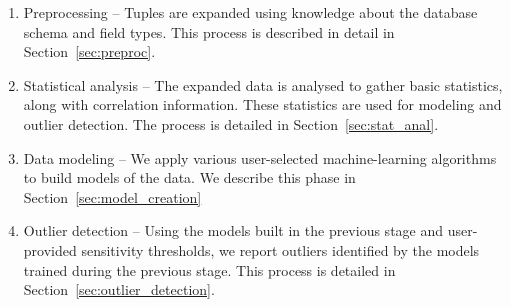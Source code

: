 \begin{enumerate}
	\item Preprocessing -- Tuples are expanded using knowledge about the database schema and field types. This process is described in detail in Section~\ref{sec:preproc}.

	\item Statistical analysis -- The expanded data is analysed to gather basic statistics, along with correlation information. These statistics are used for modeling and outlier detection. The process is detailed in Section~\ref{sec:stat_anal}.

	\item Data modeling -- We apply various user-selected machine-learning algorithms to build models of the data. We describe this phase in Section~\ref{sec:model_creation}

	\item Outlier detection -- Using the models built in the previous stage and user-provided sensitivity thresholds, we report outliers identified by the models trained during the previous stage. This process is detailed in Section~\ref{sec:outlier_detection}.
\end{enumerate}

